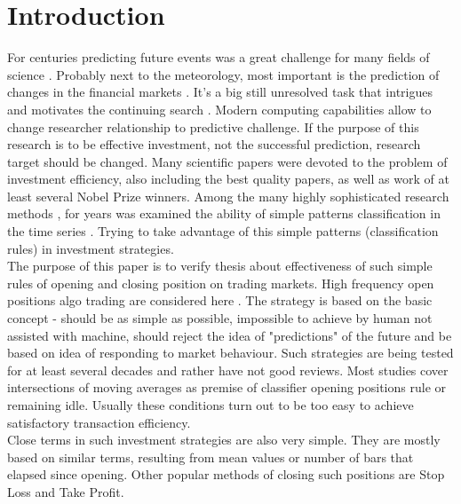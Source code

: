 \section{Introduction}
\label{sec:c3Introduction}
\indent For centuries predicting future events was a great challenge for many fields of science \cite{ball07, wu12}. Probably next to the meteorology, most important is the prediction of changes in the financial markets \cite{krutsinger99, satchwell05, schwager02}. It's a big still unresolved task that intrigues and motivates the continuing search \cite{fama91, fama98}. Modern computing capabilities allow to change researcher relationship to predictive challenge. If the purpose of this research is to be effective investment, not the successful prediction, research target should be changed. Many scientific papers were devoted to the problem of investment efficiency, also including the best quality papers, as well as work of at least several Nobel Prize winners. Among the many highly sophisticated research methods \cite{fujimoto03, kompa08, pawlak02, pedrycz97, rua09, raghuraj09, wilinski09}, for years was examined the ability of simple patterns classification in the time series \cite{brock92, cai05, gencay99, lebaron99, satchwell05}. Trying to take advantage of this simple patterns (classification rules) in investment strategies.\\
\indent The purpose of this paper is to verify thesis about effectiveness of such simple rules of opening and closing position on trading markets. High frequency open positions algo trading are considered here \cite{muriel04}. The strategy is based on the basic concept - should be as simple as possible, impossible to achieve by human not assisted with machine, should reject the idea of "predictions" of the future and be based on idea of responding to market behaviour. Such strategies are being tested for at least several decades and rather have not good reviews. Most studies cover intersections of moving averages as premise of classifier opening positions rule or remaining idle. Usually these conditions turn out to be too easy to achieve satisfactory transaction efficiency.\\
\indent Close terms in such investment strategies are also very simple. They are mostly based on similar terms, resulting from mean values or number of bars that elapsed since opening. Other popular methods of closing such positions are Stop Loss and Take Profit.
